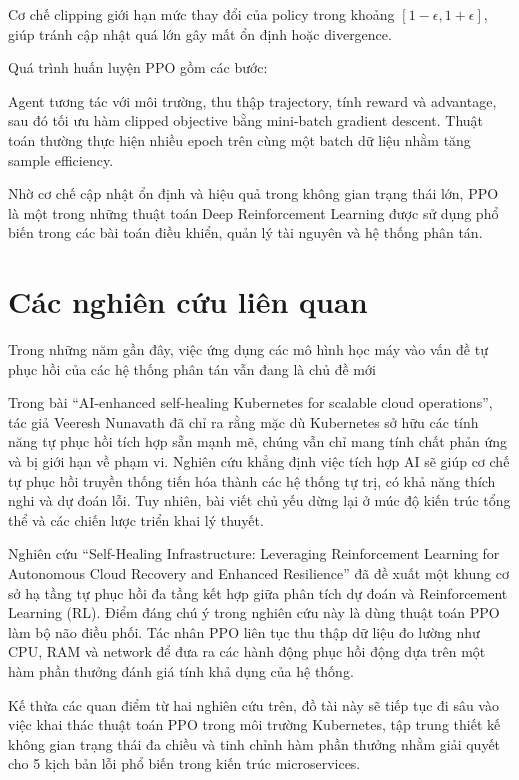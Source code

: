 Cơ chế clipping giới hạn mức thay đổi của policy trong khoảng $[1-\epsilon, 1+\epsilon]$, giúp tránh cập nhật quá lớn gây mất ổn định hoặc divergence.

Quá trình huấn luyện PPO gồm các bước:

Agent tương tác với môi trường, thu thập trajectory, tính reward và advantage, sau đó tối ưu hàm clipped objective bằng mini-batch gradient descent. Thuật toán thường thực hiện nhiều epoch trên cùng một batch dữ liệu nhằm tăng sample efficiency.

Nhờ cơ chế cập nhật ổn định và hiệu quả trong không gian trạng thái lớn, PPO là một trong những thuật toán Deep Reinforcement Learning được sử dụng phổ biến trong các bài toán điều khiển, quản lý tài nguyên và hệ thống phân tán.


\section{Các nghiên cứu liên quan}

Trong những năm gần đây, việc ứng dụng các mô hình học máy vào vấn đề tự phục hồi của các hệ thống phân tán vẫn đang là chủ đề mới

Trong bài “AI-enhanced self-healing Kubernetes for scalable cloud operations”, tác giả Veeresh Nunavath đã chỉ ra rằng mặc dù Kubernetes sở hữu các tính năng tự phục hồi tích hợp sẵn mạnh mẽ, chúng vẫn chỉ mang tính chất phản ứng và bị giới hạn về phạm vi. Nghiên cứu khẳng định việc tích hợp AI sẽ giúp cơ chế tự phục hồi truyền thống tiến hóa thành các hệ thống tự trị, có khả năng thích nghi và dự đoán lỗi. Tuy nhiên, bài viết chủ yếu dừng lại ở múc độ kiến trúc tổng thể và các chiến lược triển khai lý thuyết.

Nghiên cứu “Self-Healing Infrastructure: Leveraging Reinforcement Learning for Autonomous Cloud Recovery and Enhanced Resilience” đã đề xuất một khung cơ sở hạ tầng tự phục hồi đa tầng kết hợp giữa phân tích dự đoán và Reinforcement Learning (RL). Điểm đáng chú ý trong nghiên cứu này là dùng thuật toán PPO làm bộ não điều phối. Tác nhân PPO liên tục thu thập dữ liệu đo lường như CPU, RAM và network để đưa ra các hành động phục hồi động dựa trên một hàm phần thưởng đánh giá tính khả dụng của hệ thống.

Kế thừa các quan điểm từ hai nghiên cứu trên, đồ tài này sẽ tiếp tục đi sâu vào việc khai thác thuật toán PPO trong môi trường Kubernetes, tập trung thiết kế không gian trạng thái đa chiều và tinh chỉnh hàm phần thưởng nhằm giải quyết cho 5 kịch bản lỗi phổ biến trong kiến trúc microservices.

